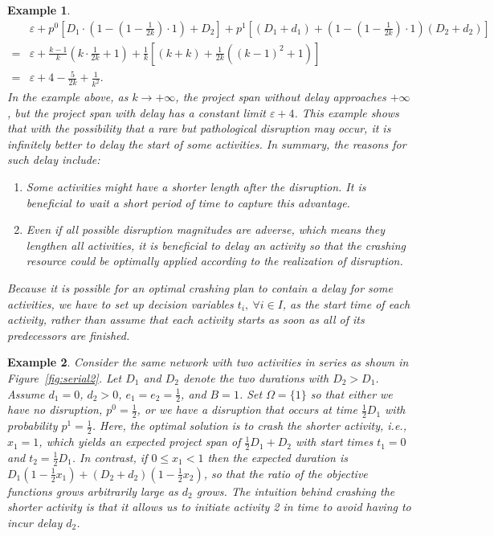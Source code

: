 \documentclass[11pt]{article}
\newtheorem{example}{Example}
\begin{document}
\begin{example}
		\begin{subequations}
			\begin{align}\label{delay}
				&\varepsilon + p^0 \left[D_1 \cdot \left(1 - (1 - \frac{1}{2k}) \cdot 1 \right) + D_2 \right]  + p^1 \left[(D_1 + d_1) + \left(1 - (1 - \frac{1}{2k}) \cdot 1 \right) (D_2 + d_2) \right]\\
				= & \varepsilon + \frac{k - 1}{k} \left(k \cdot \frac{1}{2k} + 1\right) + \frac{1}{k} \left[ (k + k) + \frac{1}{2k} \left((k-1)^2 + 1\right) \right] \\
				= & \varepsilon + 4 - \frac{5}{2k} + \frac{1}{k^2}.
			\end{align}
		\end{subequations}
		In the example above, as \(k \to +\infty\), the project span without delay approaches \(+\infty\), but the project span with delay has a constant limit \(\varepsilon + 4\). This example shows that with the possibility that a rare but pathological disruption may occur, it is infinitely better to delay the start of some activities. In summary, the reasons for such delay include:
		\begin{enumerate}
			\item Some activities might have a shorter length after the disruption. It is beneficial to wait a short period of time to capture this advantage.
			\item Even if all possible disruption magnitudes are adverse, which means they lengthen all activities, it is beneficial to delay an activity so that the crashing resource could be optimally applied according to the realization of disruption.
		\end{enumerate}
		Because it is possible for an optimal crashing plan to contain a delay for some activities, we have to set up decision variables \(t_i,\ \forall i \in I\), as the start time of each activity, rather than assume that each activity starts as soon as all of its predecessors are finished. 
	\end{example}
	\begin{example} \label{eg:short}
		Consider the same network with two activities in series as shown in Figure~\ref{fig:serial2}. Let $D_1$ and $D_2$ denote the two durations with $D_2 > D_1$. Assume $d_1=0$, $d_2 > 0$, $e_1=e_2=\frac{1}{2}$, and $B=1$. Set $\Omega=\{1\}$ so that either we have no disruption, $p^0=\frac{1}{2}$, or we have a disruption that occurs at time $\frac{1}{2}D_1$ with probability $p^1=\frac{1}{2}$. Here, the optimal solution is to crash the shorter activity, i.e., $x_1=1$, which yields an expected project span of $\frac{1}{2}D_1 + D_2$ with start times $t_1=0$ and $t_2=\frac{1}{2}D_1$. In contrast, if $0 \le x_1 < 1$ then the expected duration is $D_1 (1-\frac{1}{2} x_1) + (D_2 + d_2)(1-\frac{1}{2} x_2)$, so that the ratio of the objective functions grows arbitrarily large as $d_2$ grows. The intuition behind crashing the shorter activity is that it allows us to initiate activity 2 in time to avoid having to incur delay $d_2$.
	\end{example}
\end{document}
